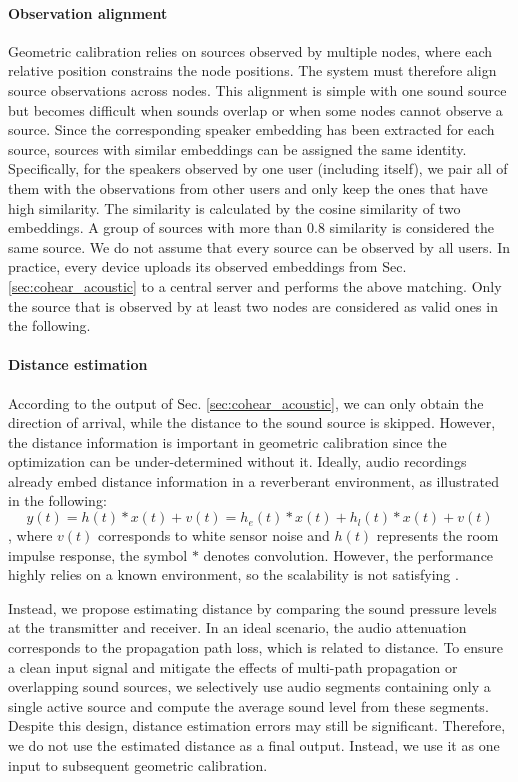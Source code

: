 \paragraph{Observation alignment}
\label{sec:cohear_sharing}
Geometric calibration relies on sources observed by multiple nodes, where each relative position constrains the node positions. The system must therefore align source observations across nodes.
This alignment is simple with one sound source but becomes difficult when sounds overlap or when some nodes cannot observe a source. Since the corresponding speaker embedding has been extracted for each source, sources with similar embeddings can be assigned the same identity.
Specifically, for the speakers observed by one user (including itself), we pair all of them with the observations from other users and only keep the ones that have high similarity. The similarity is calculated by the cosine similarity of two embeddings.
A group of sources with more than 0.8 similarity is considered the same source. We do not assume that every source can be observed by all users.
In practice, every device uploads its observed embeddings from Sec. \ref{sec:cohear_acoustic} to a central server and performs the above matching. Only the source that is observed by at least two nodes are considered as valid ones in the following.

\paragraph{Distance estimation}
\label{sec:cohear_distance}
According to the output of Sec. \ref{sec:cohear_acoustic}, we can only obtain the direction of arrival, while the distance to the sound source is skipped.
However, the distance information is important in geometric calibration since the optimization can be under-determined without it. Ideally, audio recordings already embed distance information in a reverberant environment, as illustrated in the following:
\[
y(t) = h(t) * x(t) + v(t) = h_{e}(t) * x(t) + h_{l}(t) * x(t) + v(t)
\], where \( v(t) \) corresponds to white sensor noise and \( h(t) \) represents the room impulse response, the symbol \( * \) denotes convolution. However, the performance highly relies on a known environment, so the scalability is not satisfying \cite{krause2021joint, gburrek2021geometry}.

Instead, we propose estimating distance by comparing the sound pressure levels at the transmitter and receiver. In an ideal scenario, the audio attenuation corresponds to the propagation path loss, which is related to distance. To ensure a clean input signal and mitigate the effects of multi-path propagation or overlapping sound sources, we selectively use audio segments containing only a single active source and compute the average sound level from these segments.
Despite this design, distance estimation errors may still be significant. Therefore, we do not use the estimated distance as a final output. Instead, we use it as one input to subsequent geometric calibration.



